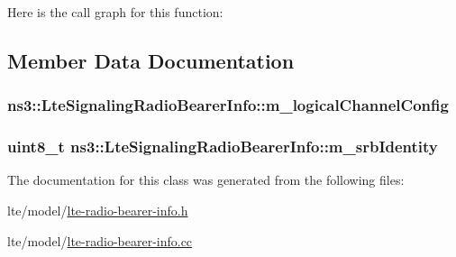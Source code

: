 Here is the call graph for this function\+:




\subsection{Member Data Documentation}
\subsubsection[{\texorpdfstring{m\+\_\+logical\+Channel\+Config}{m_logicalChannelConfig}}]{ ns3\+::\+Lte\+Signaling\+Radio\+Bearer\+Info\+::m\+\_\+logical\+Channel\+Config}\hypertarget{classns3_1_1LteSignalingRadioBearerInfo_a4dbfd06388abd08d6995cb02441f9032}{}\label{classns3_1_1LteSignalingRadioBearerInfo_a4dbfd06388abd08d6995cb02441f9032}
\subsubsection[{\texorpdfstring{m\+\_\+srb\+Identity}{m_srbIdentity}}]{\setlength{\rightskip}{0pt plus 5cm}uint8\+\_\+t ns3\+::\+Lte\+Signaling\+Radio\+Bearer\+Info\+::m\+\_\+srb\+Identity}\hypertarget{classns3_1_1LteSignalingRadioBearerInfo_ac799eb6395891e0df65c41776b16df60}{}\label{classns3_1_1LteSignalingRadioBearerInfo_ac799eb6395891e0df65c41776b16df60}


The documentation for this class was generated from the following files\+:\begin{DoxyCompactItemize}
\item 
lte/model/\hyperlink{lte-radio-bearer-info_8h}{lte-\/radio-\/bearer-\/info.\+h}\item 
lte/model/\hyperlink{lte-radio-bearer-info_8cc}{lte-\/radio-\/bearer-\/info.\+cc}\end{DoxyCompactItemize}
